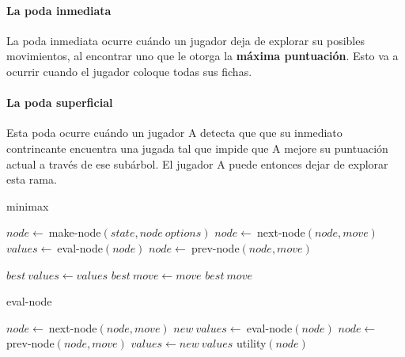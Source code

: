 \paragraph{La poda inmediata}
La poda inmediata ocurre cuándo un jugador deja de explorar su posibles
movimientos, al encontrar uno que le otorga la \textbf{máxima puntuación}. Esto
va a ocurrir cuando el jugador coloque todas sus fichas.

\paragraph{La poda superficial}
Esta poda ocurre cuándo un jugador A detecta que que su inmediato contrincante
encuentra una jugada tal que impide que A mejore su puntuación actual a través
de ese subárbol. El jugador A puede entonces dejar de explorar esta rama.

\clearpage
\begin{algorithm}
\caption{minimax}\label{alg:minimax}
\begin{algorithmic}
	 
	\State $node \gets\ $make-node$(state, node\ options)$
		\State $node \gets\ $next-node$(node, move)$ 
		\State $values \gets\ $eval-node$(node)$
		\State $node \gets\ $prev-node$(node, move)$ 
	\EndFor

		\State $best\ values \gets values$
		\State $best\ move \gets move$
	\EndIf
	\State \Return $best\ move$
	\EndFunction
\end{algorithmic}
\end{algorithm}

\begin{algorithm}
\caption{eval-node}\label{alg:eval-node}
\begin{algorithmic}
		\State $node \gets\ $next-node$(node, move)$  
		\State $new\ values \gets\ $eval-node$(node)$
		\State $node \gets\ $prev-node$(node, move)$  
	\EndFor
		\State $values \gets new\ values$
	\EndIf
	\State \Return utility$(node)$
	\EndFunction
\end{algorithmic}
\end{algorithm}

